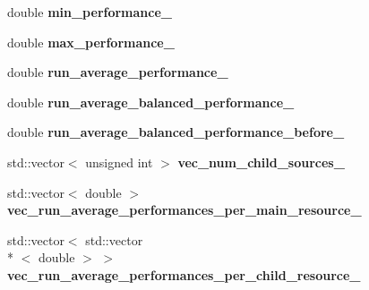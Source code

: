 \begin{DoxyCompactItemize}
\item 
\hypertarget{structStruct__PerformanceMonitoring_af00d1d134575d0f5ccc3088bc468ab89}{double {\bfseries min\-\_\-performance\-\_\-}}\label{structStruct__PerformanceMonitoring_af00d1d134575d0f5ccc3088bc468ab89}

\item 
\hypertarget{structStruct__PerformanceMonitoring_a6a66143217c890e69bde67de78a38c80}{double {\bfseries max\-\_\-performance\-\_\-}}\label{structStruct__PerformanceMonitoring_a6a66143217c890e69bde67de78a38c80}

\item 
\hypertarget{structStruct__PerformanceMonitoring_a05d5a654c9026decca3ea69752d7ef61}{double {\bfseries run\-\_\-average\-\_\-performance\-\_\-}}\label{structStruct__PerformanceMonitoring_a05d5a654c9026decca3ea69752d7ef61}

\item 
\hypertarget{structStruct__PerformanceMonitoring_a2dcbd8f140c688c7efc2f5c755074d01}{double {\bfseries run\-\_\-average\-\_\-balanced\-\_\-performance\-\_\-}}\label{structStruct__PerformanceMonitoring_a2dcbd8f140c688c7efc2f5c755074d01}

\item 
\hypertarget{structStruct__PerformanceMonitoring_ab346e075b6035bd4cc75f4c6a3536c98}{double {\bfseries run\-\_\-average\-\_\-balanced\-\_\-performance\-\_\-before\-\_\-}}\label{structStruct__PerformanceMonitoring_ab346e075b6035bd4cc75f4c6a3536c98}

\item 
\hypertarget{structStruct__PerformanceMonitoring_a55cf855d80649986fbb2530ea0fe80ba}{std\-::vector$<$ unsigned int $>$ {\bfseries vec\-\_\-num\-\_\-child\-\_\-sources\-\_\-}}\label{structStruct__PerformanceMonitoring_a55cf855d80649986fbb2530ea0fe80ba}

\item 
\hypertarget{structStruct__PerformanceMonitoring_a3b3938a4d94d1432357d6f577aba7839}{std\-::vector$<$ double $>$ {\bfseries vec\-\_\-run\-\_\-average\-\_\-performances\-\_\-per\-\_\-main\-\_\-resource\-\_\-}}\label{structStruct__PerformanceMonitoring_a3b3938a4d94d1432357d6f577aba7839}

\item 
\hypertarget{structStruct__PerformanceMonitoring_aba51ce2ae3d06715b36bb88676cff5ff}{std\-::vector$<$ std\-::vector\\*
$<$ double $>$ $>$ {\bfseries vec\-\_\-run\-\_\-average\-\_\-performances\-\_\-per\-\_\-child\-\_\-resource\-\_\-}}\label{structStruct__PerformanceMonitoring_aba51ce2ae3d06715b36bb88676cff5ff}

\end{DoxyCompactItemize}


